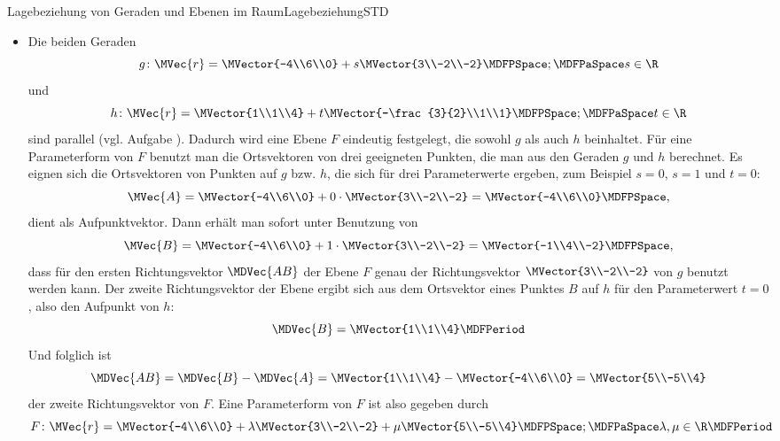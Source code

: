 \begin{MXContent}{Lagebeziehung von Geraden und Ebenen im Raum}{Lagebeziehung}{STD}
\begin{MExample}
\begin{itemize}
\item Die beiden Geraden
\[
 g\colon\MVec{r}=\MVector{-4\\6\\0}+s\MVector{3\\-2\\-2}\MDFPSpace;\MDFPaSpace s\in\R 
\]
und
\[
 h\colon\MVec{r}=\MVector{1\\1\\4}+t\MVector{-\frac{3}{2}\\1\\1}\MDFPSpace;\MDFPaSpace t\in\R 
\]
sind parallel (vgl. Aufgabe ). Dadurch wird eine Ebene $F$ eindeutig festgelegt, die sowohl $g$ als auch $h$ beinhaltet. Für eine Parameterform von $F$ benutzt man die Ortsvektoren von drei geeigneten Punkten, die man aus den Geraden $g$ und $h$ berechnet. Es eignen sich die Ortsvektoren von Punkten auf $g$ bzw. $h$, die sich für drei Parameterwerte ergeben, zum Beispiel $s=0$, $s=1$ und $t=0$:
\[
 \MVec{A}=\MVector{-4\\6\\0}+0\cdot\MVector{3\\-2\\-2}=\MVector{-4\\6\\0} \MDFPSpace,
\]
dient als Aufpunktvektor. Dann erhält man sofort unter Benutzung von 
\[
 \MVec{B}=\MVector{-4\\6\\0}+1\cdot\MVector{3\\-2\\-2}=\MVector{-1\\4\\-2} \MDFPSpace,
\]
dass für den ersten Richtungsvektor $\MDVec{A B}$ der Ebene $F$ genau der Richtungsvektor $\MVector{3\\-2\\-2}$ von $g$ benutzt werden kann. Der zweite Richtungsvektor der Ebene ergibt sich aus dem Ortsvektor eines Punktes $B$ auf $h$ für den Parameterwert $t=0$, also den Aufpunkt von $h$:
\[
 \MDVec{B}=\MVector{1\\1\\4} \MDFPeriod
\]
Und folglich ist
\[
 \MDVec{A B}=\MDVec{B}-\MDVec{A}=\MVector{1\\1\\4}-\MVector{-4\\6\\0}=\MVector{5\\-5\\4}
\]
der zweite Richtungsvektor von $F$. Eine Parameterform von $F$ ist also gegeben durch 
\[
 F\colon \MVec{r}=\MVector{-4\\6\\0}+\lambda\MVector{3\\-2\\-2}+\mu\MVector{5\\-5\\4}\MDFPSpace;\MDFPaSpace \lambda,\mu\in\R \MDFPeriod
\]


\end{itemize}
\end{MExample}
\end{MXContent}
